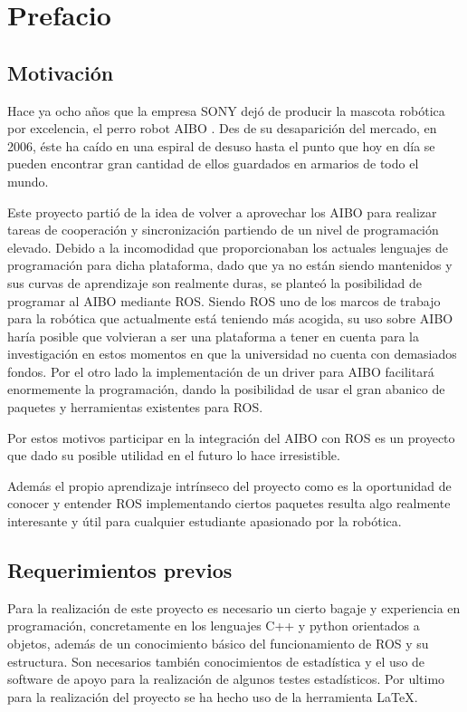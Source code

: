 \documentclass[12pt,a4paper,final,twoside]{book}
\begin{document}
\newpage
\thispagestyle{empty}
{}
\tableofcontents
\thispagestyle{fancy}
\newpage
{}
\listoffigures
\thispagestyle{fancy}
\newpage
{}
\listoftables
\thispagestyle{fancy}
\newpage


\chapter{Prefacio}
\thispagestyle{fancy}
\section{Motivación}
 
Hace ya ocho años que la empresa SONY dejó de producir la mascota robótica por excelencia, el perro robot AIBO \cite{aibo}. Des de su desaparición del mercado, en 2006, éste ha caído en una espiral de desuso hasta el punto que hoy en día se pueden encontrar gran cantidad de ellos guardados en armarios de todo el mundo.

Este proyecto partió de la idea de volver a aprovechar los AIBO para realizar tareas de cooperación y sincronización partiendo de un nivel de programación elevado. Debido a la incomodidad que proporcionaban los actuales lenguajes de programación para dicha plataforma, dado que ya no están siendo mantenidos y sus curvas de aprendizaje son realmente duras,   se planteó la posibilidad de programar al AIBO mediante ROS\cite{ros}.
Siendo ROS uno de los marcos de trabajo para la robótica que actualmente está teniendo más acogida, su uso sobre AIBO haría posible que volvieran a ser una plataforma a tener en cuenta para la investigación en estos momentos en que la universidad no cuenta con demasiados fondos. Por el otro lado la implementación de un driver para AIBO facilitará enormemente la programación, dando la posibilidad de usar el gran abanico de paquetes y herramientas existentes para ROS.

Por estos motivos participar en la integración del AIBO con ROS es un proyecto que dado su posible utilidad en el futuro lo hace irresistible.

Además el propio aprendizaje intrínseco del proyecto como es la oportunidad de conocer y entender ROS implementando ciertos paquetes resulta algo realmente interesante y útil para cualquier estudiante apasionado por la robótica.


\section{Requerimientos previos}
Para la realización de este proyecto es necesario un cierto bagaje y experiencia en programación, concretamente en los lenguajes C++ y python orientados a objetos, además de un conocimiento básico del funcionamiento de ROS y su estructura.
Son necesarios también conocimientos de estadística y el uso de software de apoyo para la realización de algunos testes estadísticos.
Por ultimo para la realización del proyecto se ha hecho uso de la herramienta \LaTeX. 
\newpage
\clearpage
\end{document}
